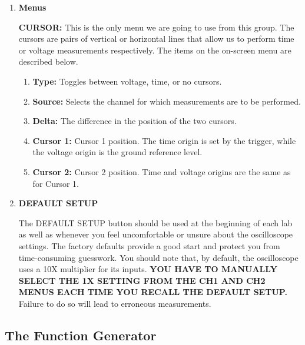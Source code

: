 \begin{enumerate}
\begin{enumerate}
\end{enumerate}

\item {\bf Menus}

{\bf CURSOR:} This is the only menu we are going to use from this group. The
cursors are pairs of vertical or horizontal lines that allow us to perform
time or voltage measurements respectively. The items on the on-screen menu
are described below.

\begin{enumerate}

\item {\bf Type:} Toggles between voltage, time, or no cursors.

\item {\bf Source:} Selects the channel for which measurements are to be
performed.

\item {\bf Delta:} The difference in the position of the two cursors.

\item {\bf Cursor 1:} Cursor 1 position. The time origin is set by the
trigger, while the voltage origin is the ground reference level.

\item {\bf Cursor 2:} Cursor 2 position. Time and voltage origins are the same as
for Cursor 1.

\end{enumerate}

\item {\bf DEFAULT SETUP}

The DEFAULT SETUP button should be used at the beginning of each lab as well as
whenever you feel uncomfortable or unsure about the oscilloscope settings. The
factory defaults provide a good start and protect you from time-consuming
guesswork. You should note that, by default, the oscilloscope uses a 10X
multiplier for its inputs. {\bf YOU HAVE TO MANUALLY SELECT THE 1X SETTING FROM
THE CH1 AND CH2 MENUS EACH TIME YOU RECALL THE DEFAULT SETUP.} Failure to do so
will lead to erroneous measurements.

\end{enumerate}

\subsection{The Function Generator}

